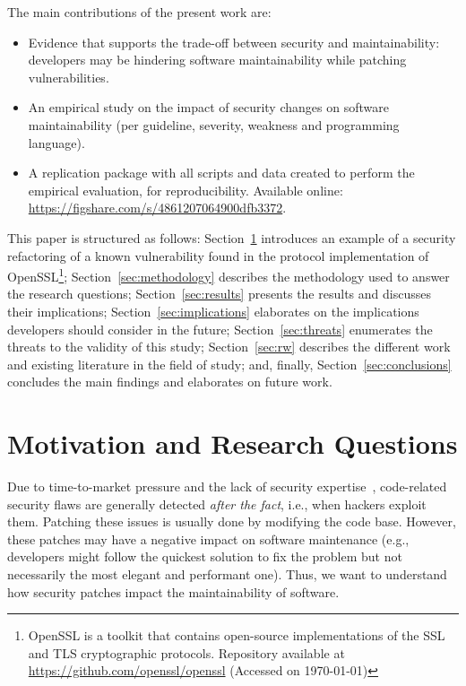 \documentclass[smallextended]{svjour3}       %
\begin{document}
The main contributions of the present work are:
%
\begin{itemize}
  \item Evidence that supports the trade-off between security and maintainability:
  developers may be hindering software maintainability while patching vulnerabilities.
	\item An empirical study on the impact of security changes on software
  maintainability (per guideline, severity, weakness and programming language).
	\item A replication package with all scripts and data created to perform the
	empirical evaluation, for reproducibility. Available online:
  \url{https://figshare.com/s/4861207064900dfb3372}.
\end{itemize}
%
This paper is structured as follows: Section~\ref{sec:motivation} introduces an
example of a security refactoring of a known vulnerability found in the
protocol implementation of OpenSSL\footnote{\label{openssl}OpenSSL is a toolkit that
contains open-source implementations of the SSL and TLS cryptographic
protocols. Repository available at \url{https://github.com/openssl/openssl}
(Accessed on \today{})}; Section~\ref{sec:methodology} describes the
methodology used to answer the research questions; Section~\ref{sec:results}
presents the results and discusses their
implications; Section~\ref{sec:implications} elaborates on the implications
developers should consider in the future; Section~\ref{sec:threats} enumerates 
the threats to the validity of
this study; Section~\ref{sec:rw} describes the different work and existing
literature in the field of study; and, finally, Section~\ref{sec:conclusions}
concludes the main findings and elaborates on future work.

\section{Motivation and Research Questions}\label{sec:motivation}
%
Due to time-to-market pressure and the lack of security expertise~\cite{8077802}, code-related
security flaws are generally detected \textit{after the fact}, i.e., when
hackers exploit them. Patching these issues is usually done by modifying the code base. 
However, these patches may have a
negative impact on software maintenance (e.g., developers might follow the
quickest solution to fix the problem but not necessarily the most elegant and
performant one). Thus, we want to understand how security patches impact
the maintainability of software. 
\end{document}
